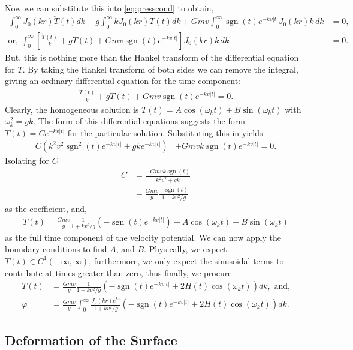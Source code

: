 \documentclass[12pt]{article}
\DeclareMathOperator{\sgn}{sgn}
\begin{document}
Now we can substitute this into \eqref{eq:presscond} to obtain,
\begin{align*}
\int_0^\infty J_0(kr)  \ddot{T}(t) dk + g \int_0^\infty k J_0(kr) T(t) dk + Gmv \int_0^\infty \sgn(t) e^{-kv|t|} J_0(kr)k \, dk &= 0, \\
\text{or, } \int_0^\infty \left[ \frac{\ddot{T}(t)}{k} + gT(t) + Gmv \sgn(t) e^{-kv|t|} \right] J_0(kr) k \, dk &= 0.
\end{align*}
But, this is nothing more than the Hankel transform of the differential equation for $T$. By taking the Hankel transform of both sides we can remove the integral, giving an ordinary differential equation for the time component:
\begin{align*}
\frac{\ddot{T}(t)}{k} + gT(t) + Gmv \sgn(t) e^{-kv|t|} = 0.
\end{align*}
Clearly, the homogeneous solution is $T(t) = A \cos(\omega_k t) + B \sin(\omega_k t)$ with $\omega_k^2 = gk$. The form of this differential equations suggests the form $T(t) = C e^{-kv|t|}$ for the particular solution. Substituting this in yields
\begin{align*}
C \left(k^2 v^2 \sgn^2(t) e^{-kv |t|} + gk e^{-kv |t|} \right) &+ Gmvk \sgn(t) e^{-kv|t|} = 0.
\end{align*}
Isolating for $C$ 
\begin{align*}
C &= \frac{-Gmvk \sgn(t)}{k^2v^2 + gk} \\
&= \frac{Gmv}{g} \frac{-\sgn(t)}{1+kv^2/g}
\end{align*}
as the coefficient, and,
\begin{align*}
T(t) = \frac{Gmv}{g} \frac{1}{1+kv^2/g} \left( -\sgn(t) e^{-kv|t|} \right) + A \cos(\omega_k t) + B \sin(\omega_k t)
\end{align*}
as the full time component of the velocity potential. We can now apply the boundary conditions to find $A$, and $B$. Physically, we expect $T(t) \in C^1(-\infty,\infty)$, furthermore, we only expect the sinusoidal terms to contribute at times greater than zero, thus finally, we procure
\begin{align*}
T(t) &= \frac{Gmv}{g}\frac{1}{1+kv^2/g} \left(-\sgn(t)e^{-kv|t|} + 2H(t)\cos(\omega_k t) \right)dk, \text{ and,} \\
\varphi &= \frac{Gmv}{g} \int_0^\infty \frac{J_0(kr)e^{kz}}{1+kv^2/g} \left(-\sgn(t)e^{-kv|t|} + 2H(t)\cos(\omega_k t) \right) dk.
\end{align*}

\subsection{Deformation of the Surface}
\end{document}
